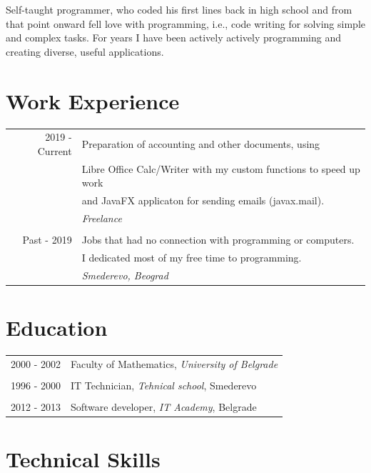 \documentclass[a4paper,11pt]{article}
\begin{document}
{Self-taught programmer, who coded his first lines back in high school and from that point onward fell love with programming, i.e., code writing for solving simple and complex tasks. For years I have been actively actively programming and creating diverse, useful applications.
  
  \section*{Work Experience}
  
  \begin{tabular}{r|l}
    2019 - Current  & Preparation of accounting and other documents, using\\ 
                     & Libre Office Calc/Writer with my custom functions to speed up work\\
                     & and JavaFX applicaton for sending emails (javax.mail).\\
                     & \emph{Freelance}\\
    \multicolumn{2}{c}{} \\
    Past - 2019 & Jobs that had no connection with programming or computers.\\
                     & I dedicated most of my free time to programming.\\
                     & \emph{Smederevo, Beograd}\\
  \end{tabular}
  
  \section*{Education}
  
  \begin{tabular}{r|l}
    2000 - 2002 & Faculty of Mathematics, \emph{University of Belgrade}\\
    \multicolumn{2}{c}{} \\
    1996 - 2000 & IT Technician, \emph{Tehnical school}, Smederevo\\
    \multicolumn{2}{c}{} \\
    2012 - 2013 & Software developer, \emph{IT Academy}, Belgrade\\ 
  \end{tabular}
  
  \section*{Technical Skills}
  
}
\end{document}
